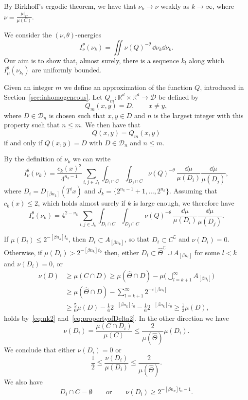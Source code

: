 By Birkhoff's ergodic theorem, we have that $\nu_k \to \nu$ weakly as $k \to \infty$, where $\nu = \frac{\mu|_C}{\mu (C)}$.

We consider the $(\nu, \theta)$-energies
\[
I_\nu^\theta (\nu_k) = \iint \nu (Q)^{-\theta} \, \dd \nu_k
\dd \nu_k.
\]
Our aim is to show that, almost surely, there is a sequence $k_l$ along which $I_\mu^\theta (\nu_{k_l})$ are uniformly bounded.

Given an integer $m$ we define an approximation of the function $Q$, introduced in Section~\ref{sec:inhomogeneous}. Let $Q_m \colon
\mathbb{R}^d \times \mathbb{R}^d \to \mathscr{D}$ be defined by
\[
Q_m (x,y) = D, \qquad x \neq y,
\]
where $D \in \mathscr{D}_n$ is chosen such that $x,y \in D$ and $n$ is the largest integer with this property such that $n \leq m$. We then have that
\[
Q (x,y) = Q_m (x,y)
\]
if and only if $Q (x,y) = D$ with $D \in \mathscr{D}_n$ and $n \leq m$.

By the definition of $\nu_k$ we can write
\[
I_\nu^\theta (\nu_k) = \frac{c_k (x)^2} {4^{n_k-1}} \sum_{i,j \in J_k}
\int_{D_i \cap C} \int_{D_j \cap C} \nu (Q)^{-\theta} \,
\frac{\dd \mu}{\mu (D_i)} \frac{\dd \mu}{\mu (D_j)},
\]
where $D_i = D_{[\beta n_k]} (T^i x)$ and $J_k = \{2^{n_k-1} +1,
\ldots, 2^{n_k} \}$. Assuming that $c_k (x) \leq 2$, which holds almost surely if $k$ is large enough, we therefore have
\begin{equation}\label{eq:nuenergy}
I_\nu^\theta (\nu_k) = 4^{2-n_k} \sum_{i,j \in J_k}
\int_{D_i \cap C} \int_{D_j \cap C} \nu (Q)^{-\theta} \,
\frac{\dd \mu}{\mu (D_i)} \frac{\dd \mu}{\mu (D_j)}.
\end{equation}

If $\mu (D_i) \leq 2^{-[\beta n_k] t_0}$, then $D_i \subset A_{[\beta n_k]}$, so that $D_i \subset C^\complement$ and $\nu (D_i) = 0$. Otherwise, if $\mu (D_i) > 2^{-[\beta n_k] t_0}$ then, either $D_i \subset
\hat{\Theta}^\complement \cup A_{[\beta n_l]}$ for some $l < k$ and $\nu (D_i) = 0$, or
\begin{align*}
\nu (D) &\geq \mu (C \cap D) \geq \mu (\hat{\Theta} \cap D) - \mu
\biggl(\bigcup_{l = k+1}^\infty A_{[\beta n_l]} \biggr) \\ &\geq
\mu (\hat{\Theta} \cap D) - \sum_{l=k+1}^\infty 2^{-\varepsilon [\beta n_l]} \\ &\geq \frac{5}{6} \mu (D) - \frac{1}{6} 2^{-[\beta n_k] t_0} - \frac{1}{6} 2^{-[\beta n_k] t_0} \geq \frac{1}{2}
\mu (D),
\end{align*}
holds by~\eqref{eq:nk2} and~\eqref{eq:propertyofDelta2}. In the other direction we have
\[
\nu (D_i) = \frac{\mu (C \cap D_i)}{\mu (C)} \leq \frac{2}{\mu (\hat{\Theta})} \mu (D_i).
\]
We conclude that either $\nu (D_i) = 0$ or
\begin{equation}\label{eq:mu-nu-ratio}
\frac{1}{2} \leq \frac{\nu (D_i)}{\mu (D_i)} \leq \frac{2}{\mu (\hat{\Theta})}.
\end{equation}
We also have
\begin{equation}\label{eq:nuestimate}
D_i \cap C = \emptyset \qquad \text{or} \qquad \nu (D_i) \geq 2^{-[\beta n_k] t_0 - 1}.
\end{equation}


